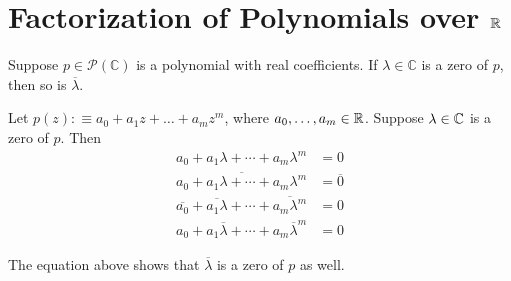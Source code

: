 \section{Factorization of Polynomials over \texorpdfstring{$\mathbb{R}$}{R}}

\begin{thm}
  \label{thm: polynomials with real coefficients have nonreal zeros in pairs}
  Suppose $p\in \mathcal{P} (\mathbb{C})$ is a polynomial with real coefficients. If $\lambda \in \mathbb{C}$ is a zero of $p$, then so is $\overline{\lambda}$.
\end{thm}
\begin{prf}
  Let $p(z) :\equiv a_0 + a_1 z + \ldots + a_m z^m$, where $a_0, \ldots, a_m \in \mathbb{R}$. Suppose $\lambda \in \mathbb{C}$ is a zero of $p$. Then
  \begin{equation}
    \begin{aligned}
      a_0+a_1\lambda+\cdots+a_m\lambda^m&=0\\
      \overline{a_0+a_1\lambda+\cdots+a_m\lambda^m}&=\overline{0}\\
      \overline{a_0}+\overline{a_1\lambda}+\cdots+\overline{a_m\lambda^m}&=0\\
      a_0+a_1\overline{\lambda}+\cdots+a_m\overline{\lambda}^m&=0
    \end{aligned}
  \end{equation}

  The equation above shows that $\overline{\lambda}$ is a zero of $p$ as well.
\end{prf}

